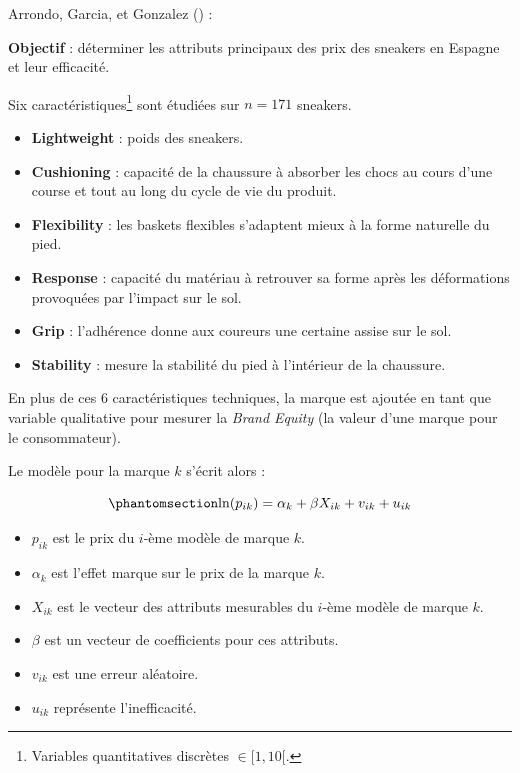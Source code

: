 \documentclass[
  12pt,
]{report}
\providecommand{\tightlist}{%
  \setlength{\itemsep}{0pt}\setlength{\parskip}{0pt}}\usepackage{longtable,booktabs,array}
\begin{document}
Arrondo, Garcia, et Gonzalez () :

\textbf{Objectif} : déterminer les attributs principaux des prix des
sneakers en Espagne et leur efficacité.

Six caractéristiques\footnote{Variables quantitatives discrètes
  \(\in [1,10[\).} sont étudiées sur \(n=171\) sneakers.

\begin{itemize}
\item
  \textbf{Lightweight} : poids des sneakers.
\item
  \textbf{Cushioning} : capacité de la chaussure à absorber les chocs au
  cours d'une course et tout au long du cycle de vie du produit.
\item
  \textbf{Flexibility} : les baskets flexibles s'adaptent mieux à la
  forme naturelle du pied.
\item
  \textbf{Response} : capacité du matériau à retrouver sa forme après
  les déformations provoquées par l'impact sur le sol.
\item
  \textbf{Grip} : l'adhérence donne aux coureurs une certaine assise sur
  le sol.
\item
  \textbf{Stability} : mesure la stabilité du pied à l'intérieur de la
  chaussure.
\end{itemize}

En plus de ces 6 caractéristiques techniques, la marque est ajoutée en
tant que variable qualitative pour mesurer la \emph{Brand Equity} (la
valeur d'une marque pour le consommateur).

\newpage

Le modèle pour la marque \(k\) s'écrit alors :

\begin{equation}\phantomsection\label{eq-arrondo}{
\ln(p_{ik}) = \alpha_k + \beta X_{ik} + v_{ik} + u_{ik}
}\end{equation}

\begin{itemize}
\tightlist
\item
  \(p_{ik}\) est le prix du \(i\)-ème modèle de marque \(k\).
\item
  \(α_k\) est l'effet marque sur le prix de la marque \(k\).
\item
  \(X_{ik}\) est le vecteur des attributs mesurables du \(i\)-ème modèle
  de marque \(k\).
\item
  \(β\) est un vecteur de coefficients pour ces attributs.
\item
  \(v_{ik}\) est une erreur aléatoire.
\item
  \(u_{ik}\) représente l'inefficacité.
\end{itemize}
\end{document}
